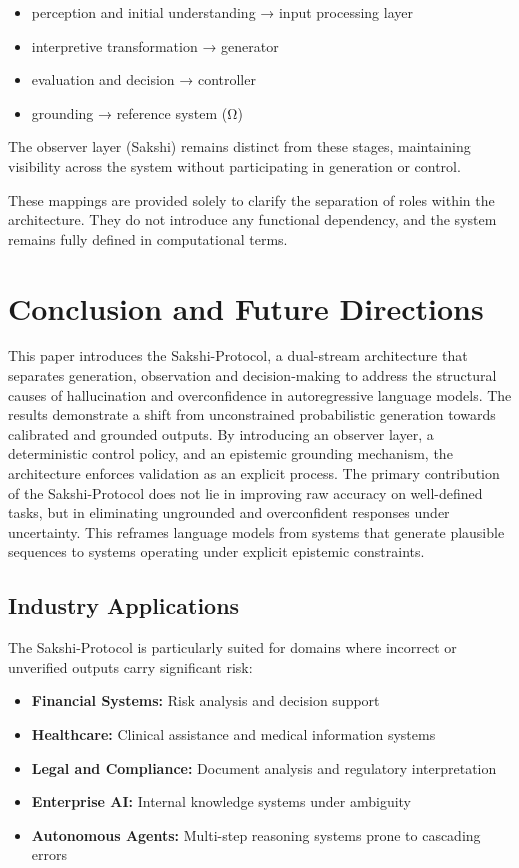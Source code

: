 \documentclass[12pt,a4paper]{article}
\begin{document}
\begin{itemize}
    \item perception and initial understanding → input processing layer
    \item interpretive transformation → generator
    \item evaluation and decision → controller
    \item grounding → reference system (Ω)
\end{itemize}

The observer layer (Sakshi) remains distinct from these stages, maintaining visibility across the system without participating in generation or control.

These mappings are provided solely to clarify the separation of roles within the architecture. They do not introduce any functional dependency, and the system remains fully defined in computational terms.

\section{Conclusion and Future Directions}
This paper introduces the Sakshi-Protocol, a dual-stream architecture that separates generation, observation and decision-making to address the structural causes of hallucination and overconfidence in autoregressive language models. The results demonstrate a shift from unconstrained probabilistic generation towards calibrated and grounded outputs. By introducing an observer layer, a deterministic control policy, and an epistemic grounding mechanism, the architecture enforces validation as an explicit process. The primary contribution of the Sakshi-Protocol does not lie in improving raw accuracy on well-defined tasks, but in eliminating ungrounded and overconfident responses under uncertainty. This reframes language models from systems that generate plausible sequences to systems operating under explicit epistemic constraints.

\subsection{Industry Applications}

The Sakshi-Protocol is particularly suited for domains where incorrect or unverified outputs carry significant risk:

\begin{itemize}
\item \textbf{Financial Systems:} 
Risk analysis and decision support
\item \textbf{Healthcare:} 
Clinical assistance and medical information systems
\item \textbf{Legal and Compliance:} 
Document analysis and regulatory interpretation
\item \textbf{Enterprise AI:} 
Internal knowledge systems under ambiguity
\item \textbf{Autonomous Agents:} 
Multi-step reasoning systems prone to cascading errors
\end{itemize}
\end{document}
